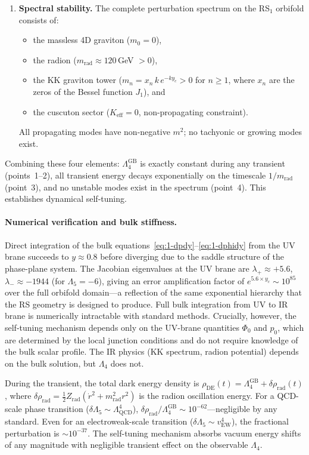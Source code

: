 \begin{enumerate}
\item \textbf{Spectral stability.} The complete perturbation spectrum on the RS$_1$ orbifold consists of:
\begin{itemize}
\item the massless 4D graviton ($m_0 = 0$),
\item the radion ($m_{\mathrm{rad}} \approx 120\,$GeV $ > 0$),
\item the KK graviton tower ($m_n = x_n\, k\, e^{-ky_c} > 0$ for $n \geq 1$, where $x_n$ are the zeros of the Bessel function $J_1$), and
\item the cuscuton sector ($K_{\mathrm{eff}} = 0$, non-propagating constraint).
\end{itemize}
All propagating modes have non-negative $m^2$; no tachyonic or growing modes exist.
\end{enumerate}

Combining these four elements: $\Lambda_4^{\mathrm{GB}}$ is exactly constant during any transient (points~1--2), all transient energy decays exponentially on the timescale $1/m_{\mathrm{rad}}$ (point~3), and no unstable modes exist in the spectrum (point~4). This establishes dynamical self-tuning.

\paragraph{Numerical verification and bulk stiffness.} Direct integration of the bulk equations~\eqref{eq:1-dpdy}--\eqref{eq:1-dphidy} from the UV brane succeeds to $y \approx 0.8$ before diverging due to the saddle structure of the phase-plane system. The Jacobian eigenvalues at the UV brane are $\lambda_+ \approx +5.6$, $\lambda_- \approx -1944$ (for $\Lambda_5 = -6$), giving an error amplification factor of $e^{5.6 \times y_c} \sim 10^{85}$ over the full orbifold domain---a reflection of the same exponential hierarchy that the RS geometry is designed to produce. Full bulk integration from UV to IR brane is numerically intractable with standard methods. Crucially, however, the self-tuning mechanism depends only on the UV-brane quantities $\Phi_0$ and $p_0$, which are determined by the local junction conditions and do not require knowledge of the bulk scalar profile. The IR physics (KK spectrum, radion potential) depends on the bulk solution, but $\Lambda_4$ does not.

\begin{remark}
During the transient, the total dark energy density is $\rho_{\mathrm{DE}}(t) = \Lambda_4^{\mathrm{GB}} + \delta\rho_{\mathrm{rad}}(t)$, where $\delta\rho_{\mathrm{rad}} = \frac{1}{2}Z_{\mathrm{rad}}(\dot{r}^2 + m_{\mathrm{rad}}^2 r^2)$ is the radion oscillation energy. For a QCD-scale phase transition ($\delta\Lambda_5 \sim \Lambda_{\mathrm{QCD}}^4$), $\delta\rho_{\mathrm{rad}}/\Lambda_4^{\mathrm{GB}} \sim 10^{-62}$---negligible by any standard. Even for an electroweak-scale transition ($\delta\Lambda_5 \sim v_{\mathrm{EW}}^4$), the fractional perturbation is $\sim 10^{-37}$. The self-tuning mechanism absorbs vacuum energy shifts of any magnitude with negligible transient effect on the observable $\Lambda_4$.
\end{remark}

